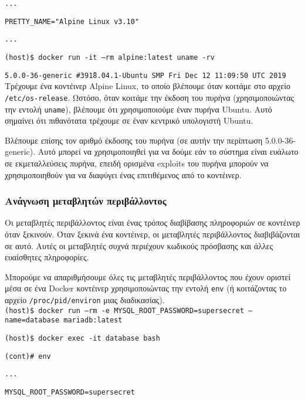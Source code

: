 \texttt{\textlatin{...}}

\texttt{\textlatin{PRETTY\_NAME="Alpine Linux v3.10"}}

\texttt{\textlatin{...}}

\texttt{\textlatin{(host)\$ docker run -it --rm alpine:latest uname -rv}}

\texttt{\textlatin{5.0.0-36-generic \#39\~18.04.1-Ubuntu SMP Fri Dec 12 11:09:50 UTC 2019}} \\


Τρέχουμε ένα κοντέινερ \textlatin{Alpine Linux}, το οποίο βλέπουμε όταν κοιτάμε
στο αρχείο \texttt{\textlatin{/etc/os-release}}. Ωστόσο, όταν κοιτάμε την έκδοση
του πυρήνα (χρησιμοποιώντας την εντολή \texttt{\textlatin{uname}}), βλέπουμε ότι
χρησιμοποιούμε έναν πυρήνα \textlatin{Ubuntu}. Αυτό σημαίνει ότι πιθανότατα
τρέχουμε σε έναν κεντρικό υπολογιστή \textlatin{Ubuntu}.

Βλέπουμε επίσης τον αριθμό έκδοσης του πυρήνα (σε αυτήν την περίπτωση
\textlatin{5.0.0-36-generic}). Αυτό μπορεί να χρησιμοποιηθεί για να δούμε εάν το
σύστημα είναι ευάλωτο σε εκμεταλλεύσεις πυρήνα, επειδή ορισμένα
\textlatin{exploits} του πυρήνα μπορούν να χρησιμοποιηθούν για να διαφύγει ένας
επιτιθέμενος από το κοντέινερ.

\subsubsection{Ανάγνωση μεταβλητών περιβάλλοντος}

Οι μεταβλητές περιβάλλοντος είναι ένας τρόπος διαβίβασης πληροφοριών σε
κοντέινερ όταν ξεκινούν. Όταν ξεκινά ένα κοντέινερ, οι μεταβλητές περιβάλλοντος
διαβιβάζονται σε αυτό. Αυτές οι μεταβλητές συχνά περιέχουν κωδικούς πρόσβασης
και άλλες ευαίσθητες πληροφορίες.

Μπορούμε να απαριθμήσουμε όλες τις μεταβλητές περιβάλλοντος που έχουν οριστεί
μέσα σε ένα \textlatin{Docker} κοντέινερ χρησιμοποιώντας την εντολή
\texttt{\textlatin{env}} (ή κοιτάζοντας το αρχείο
\texttt{\textlatin{/proc/pid/environ}} μιας διαδικασίας).\\

\texttt{\textlatin{(host)\$ docker run --rm -e MYSQL\_ROOT\_PASSWORD=supersecret --name=database mariadb:latest}}

\texttt{\textlatin{(host)\$ docker exec -it database bash}}

\texttt{\textlatin{(cont)\# env}}

\texttt{\textlatin{...}}

\texttt{\textlatin{MYSQL\_ROOT\_PASSWORD=supersecret}}

